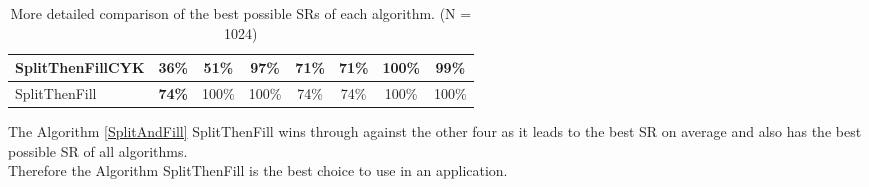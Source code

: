 \begin{table}[h]
\begin{adjustbox}{max width=\textwidth}
\begin{tabular}{|l|c|c|c|c|c|c|c|}
		SplitThenFillCYK                   &\textbf{36\%}    &51\%                                                           &97\%                                                              &71\%      &71\%                                                        &100\%                                                         &99\%                                                           \\ \hline
		SplitThenFill                    &\textbf{74\%}      &100\%                                                           &100\%                                                              &74\%      &74\%                                                        &100\%                                                         &100\%                                                           \\ \hline
	\end{tabular}
\end{adjustbox}
	\caption{More detailed comparison of the best possible SRs of each algorithm. (N = 1024)}
	\label{comparisionsAlgorithms}
\end{table}
\noindent The Algorithm \ref{SplitAndFill} SplitThenFill wins through against the other four as it leads to the best SR on average and also has the best possible SR of all algorithms. \\

\noindent Therefore the Algorithm SplitThenFill is the best choice to use in an application.

\clearpage
\pagebreak